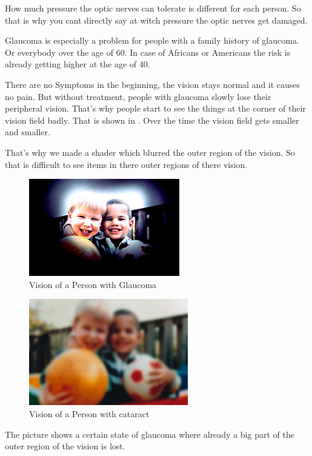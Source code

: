 \documentclass{sig-alternate-05-2015}
\begin{document}
How much pressure the optic nerves can tolerate is different for each person. So that is why you cant directly say at witch pressure the optic nerves get damaged.

Glaucoma is especially a problem for people with a family history of glaucoma. Or everybody over the age of 60. In case of Africans or Americans the risk is already getting higher at the age of 40.

There are no Symptoms in the beginning, the vision stays normal and it causes no pain. But without treatment, people with glaucoma slowly lose their peripheral vision. That's why people start to see the things at the corner of their vision field badly. That is shown in . Over the time the vision field gets smaller and smaller.~\cite{glaucomafacts}

That's why we made a shader which blurred the outer region of the vision. So that is difficult to see items in there outer regions of there vision.
%
\begin{figure}
    \centering
    \includegraphics[width=\columnwidth]{glaucomavision.png}
    \caption{Vision of a Person with Glaucoma}
    \label{fig:glaucoma}
\end{figure}
%
\begin{figure}
    \centering
    \includegraphics[width=\columnwidth]{cataractvision.png}
    \caption{Vision of a Person with cataract}
    \label{fig:cataract}
\end{figure}
%
The picture  shows a certain state of glaucoma where already a big part of the outer region of the vision is lost.
\end{document}
